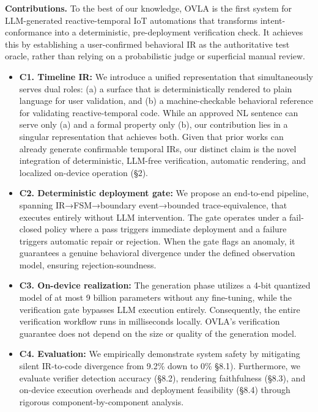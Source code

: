 \documentclass[sigconf,nonacm,anonymous,review]{acmart}
\begin{document}
\medskip\noindent\textbf{Contributions.} 
To the best of our knowledge, OVLA is the first system for LLM-generated reactive-temporal IoT automations that transforms intent-conformance into a deterministic, pre-deployment verification check. It achieves this by establishing a user-confirmed behavioral IR as the authoritative test oracle, rather than relying on a probabilistic judge or superficial manual review. %
\begin{itemize}
\item \textbf{C1. Timeline IR:} We introduce a unified representation that simultaneously serves dual roles: %
(a) a surface that is deterministically rendered to plain language for user validation, and (b) a machine-checkable behavioral reference for validating reactive-temporal code. While an approved NL sentence can serve only (a) and a formal property only (b), our contribution lies in a singular representation that achieves both. Given that prior works can already generate confirmable temporal IRs, our distinct claim is the novel integration of deterministic, LLM-free verification, automatic rendering, and localized on-device operation %
(\S2).
\item \textbf{C2. Deterministic deployment gate:} We propose an end-to-end pipeline, spanning IR→FSM→boundary event→bounded trace-equivalence, that executes entirely without LLM intervention. The gate operates under a fail-closed policy where a pass triggers immediate deployment and a failure triggers automatic repair or rejection. %
When the gate flags an anomaly, it guarantees a genuine behavioral divergence under the defined observation model, ensuring rejection-soundness.
\item \textbf{C3. On-device realization:} The generation phase utilizes a 4-bit quantized model of at most 9 billion parameters without any fine-tuning, while the verification gate bypasses LLM execution entirely. Consequently, the entire verification workflow runs in milliseconds locally. OVLA's verification guarantee does not depend on the size or quality of the generation model.
\item \textbf{C4. Evaluation:} We empirically demonstrate system safety by mitigating silent IR-to-code divergence from 9.2\% down to 0\% \S8.1). Furthermore, we evaluate verifier detection accuracy (\S8.2), rendering faithfulness (\S8.3), and on-device execution overheads and deployment feasibility (\S8.4) through rigorous component-by-component analysis.
\end{itemize}
\end{document}
